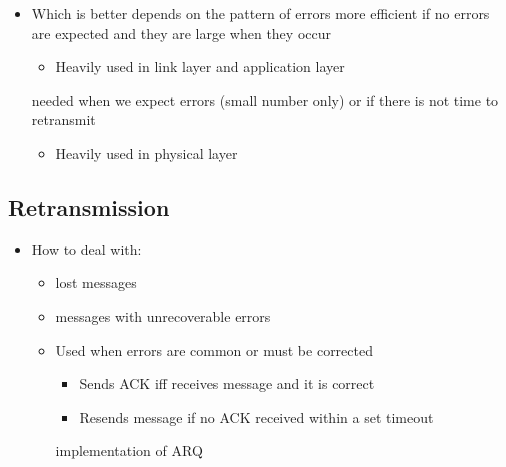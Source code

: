 \begin{itemize}
\begin{itemize}
        \end{itemize}
        \begin{itemize}
            \item Which is better depends on the pattern of errors
             more efficient if no errors are expected and they are large when they occur
                \begin{itemize}
                    \item Heavily used in link layer and application layer
                \end{itemize}
             needed when we expect errors (small number only) or if there is not time to retransmit
                \begin{itemize}
                    \item Heavily used in physical layer
                \end{itemize}
        \end{itemize}
\end{itemize}

\subsection{Retransmission}
\begin{itemize}
    \item How to deal with:
        \begin{itemize}
            \item lost messages
            \item messages with unrecoverable errors
        \end{itemize}
        \begin{itemize}
            \item Used when errors are common or must be corrected
                \begin{itemize}
                    \item Sends ACK iff receives message and it is correct
                \end{itemize}
                \begin{itemize}
                    \item Resends message if no ACK received within a set timeout
                \end{itemize}
             implementation of ARQ
        \end{itemize}
\end{itemize}

